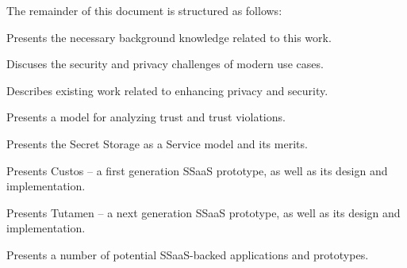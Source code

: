 The remainder of this document is structured as follows:

\begin{packed_desc}
\item[Chapter~\ref{chap:background} - Background:] Presents the
  necessary background knowledge related to this work.
\item[Chapter~\ref{chap:challenges} - Challenges:] Discuses the
  security and privacy challenges of modern use cases.
\item[Chapter~\ref{chap:related} - Related Work:] Describes existing
  work related to enhancing privacy and security.
\item[Chapter~\ref{chap:trust} - Trust Model:] Presents a model for
  analyzing trust and trust violations.
\item[Chapter~\ref{chap:ssaas} - SSaaS:] Presents the Secret Storage
  as a Service model and its merits.
\item[Chapter~\ref{chap:custos} - Custos:] Presents Custos -- a first
  generation SSaaS prototype, as well as its design and implementation.
\item[Chapter~\ref{chap:tutamen} - Tutamen:] Presents Tutamen -- a
  next generation SSaaS prototype, as well as its design and
  implementation.
\item[Chapter~\ref{chap:apps} - Applications:] Presents a number of
  potential SSaaS-backed applications and prototypes.
\end{packed_desc}

